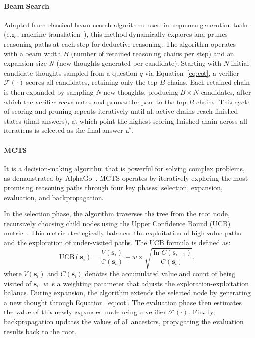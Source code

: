 \paragraph{Beam Search}


Adapted from classical beam search algorithms used in sequence generation tasks (e.g., machine translation~\cite{beamsearch4mt, beamsearch4mt2}), this method dynamically explores and prunes reasoning paths at each step for deductive reasoning.
The algorithm operates with a beam width \( B \) (number of retained reasoning chains per step) and an expansion size \( N \) (new thoughts generated per candidate).
Starting with \( N \) initial candidate thoughts sampled from a question $q$ via Equation~\ref{eq:cot}, a verifier \( \mathcal{F}(\cdot) \) scores all candidates, retaining only the top-\( B \) chains.
Each retained chain is then expanded by sampling \( N \) new thoughts, producing \( B \times N \) candidates, after which the verifier reevaluates and prunes the pool to the top-\( B \) chains.
This cycle of scoring and pruning repeats iteratively until all active chains reach finished states (final answers), at which point the highest-scoring finished chain across all iterations is selected as the final answer \( \mathbf{a}^* \).  








\paragraph{MCTS}



It is a decision-making algorithm that is powerful for solving complex problems, as demonstrated by AlphaGo~\cite{alphago, alphago1}. MCTS operates by iteratively exploring the most promising reasoning paths through four key phases: selection, expansion, evaluation, and backpropagation. 

In the selection phase, the algorithm traverses the tree from the root node, recursively choosing child nodes using the Upper Confidence Bound (UCB) metric~\cite{ucb}. This metric strategically balances the exploitation of high-value paths and the exploration of under-visited paths. The UCB formula is defined as:  
\[
\text{UCB}(\mathbf{s}_i) = \frac{V(\mathbf{s}_i)}{C(\mathbf{s}_i)} + w \times \sqrt{\frac{\ln C(\mathbf{s}_{i-1})}{C(\mathbf{s}_i)}},
\]  
where \(V(\mathbf{s}_i)\) and \( C(\mathbf{s}_i)\) denotes the accumulated value and count of being visited of \(\mathbf{s}_i\). \(w\) is a weighting parameter that adjusts the exploration-exploitation balance.
During expansion, the algorithm extends the selected node by generating a new thought through Equation~\ref{eq:cot}.
The evaluation phase then estimates the value of this newly expanded node using a verifier \(\mathcal{F}(\cdot)\).
Finally, backpropagation updates the values of all ancestors, propagating the evaluation results back to the root.

